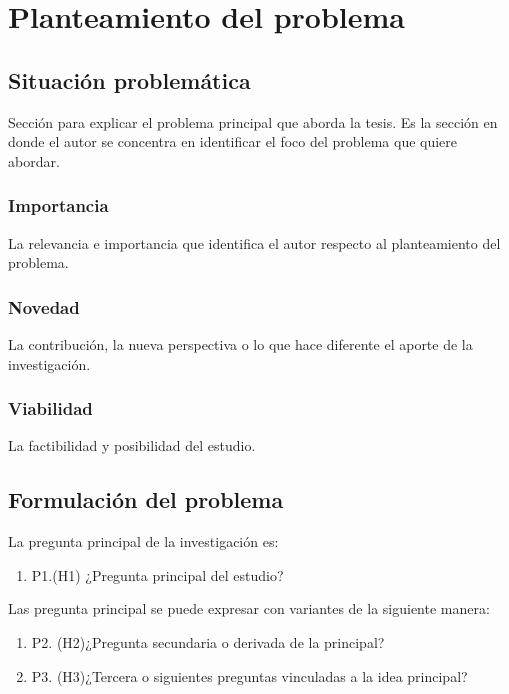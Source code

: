 \chapter{Planteamiento del problema}

\section{Situación problemática}


Sección para explicar el problema principal que aborda la tesis. Es la sección en donde el autor se concentra en identificar el foco del problema que quiere abordar. 


\subsection{Importancia}
La relevancia e importancia que identifica el autor respecto al planteamiento del problema.

\subsection{Novedad}

La contribución, la nueva perspectiva o lo que hace diferente el aporte de la investigación.


\subsection{Viabilidad}

La factibilidad y posibilidad del estudio.

\newpage

\section{Formulación del problema}


La pregunta principal de la investigación es:

\begin{enumerate}

	\item P1.(H1) ¿Pregunta principal del estudio?

\end{enumerate}

Las pregunta principal se puede expresar con variantes de la siguiente manera:

\begin{enumerate}

	\item P2. (H2)¿Pregunta secundaria o derivada de la principal?

	\item P3. (H3)¿Tercera o siguientes preguntas vinculadas a la idea principal?




\end{enumerate}

